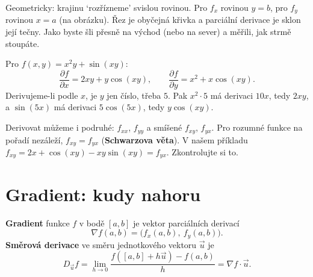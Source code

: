 Geometricky: krajinu `rozřízneme' svislou rovinou. Pro $f_x$ rovinou $y = b$, pro $f_y$ rovinou $x = a$ (na obrázku). Řez je obyčejná křivka a parciální derivace je sklon její tečny. Jako byste šli přesně na východ (nebo na sever) a měřili, jak strmě stoupáte.

\begin{center}
\end{center}

\begin{example}
  Pro $f(x, y) = x^2y + \sin(xy)$:
  \begin{equation*}
    \frac{\partial f}{\partial x} = 2xy + y\cos(xy),\qquad\frac{\partial f}{\partial y} = x^2 + x\cos(xy).
  \end{equation*}
  Derivujeme-li podle $x$, je $y$ jen číslo, třeba $5$. Pak $x^2\cdot 5$ má derivaci $10x$, tedy $2xy$, a $\sin(5x)$ má derivaci $5\cos(5x)$, tedy $y\cos(xy)$.
\end{example}

Derivovat můžeme i podruhé: $f_{xx}$, $f_{yy}$ a smíšené $f_{xy}$, $f_{yx}$. Pro rozumné funkce na pořadí nezáleží, $f_{xy} = f_{yx}$ (\textbf{Schwarzova věta}). V našem příkladu $f_{xy} = 2x + \cos(xy) - xy\sin(xy) = f_{yx}$. Zkontrolujte si to.

\section{Gradient: kudy nahoru}

\begin{definitionbox}
  \textbf{Gradient} funkce $f$ v bodě $[a, b]$ je vektor parciálních derivací
  \begin{equation*}
    \nabla f(a, b) = \big(f_x(a, b),\ f_y(a, b)\big).
  \end{equation*}
  \textbf{Směrová derivace} ve směru jednotkového vektoru $\vec{u}$ je
  \begin{equation*}
    D_{\vec{u}}f = \lim_{h\to 0}\frac{f([a, b] + h\vec{u}) - f(a, b)}{h} = \nabla f\cdot\vec{u}.
  \end{equation*}
\end{definitionbox}

